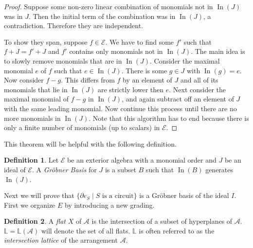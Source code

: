 \documentclass[article,twoside]{article}
\newcommand{\BB}[1]{\mathbb{#1}}
\newcommand{\script}[1]{\mathcal{#1}}
\newcommand{\initial}{\operatorname{In}}
\newcommand{\lattice}{\BB{L}}
\theoremstyle{plain}
\theoremstyle{plain}
\theoremstyle{plain}
\theoremstyle{plain}
\theoremstyle{plain}
\theoremstyle{definition}
\newtheorem{definition}[definition]{Definition}
\theoremstyle{definition}
\theoremstyle{definition}
\theoremstyle{remark}
\theoremstyle{remark}
\begin{document}
\begin{proof}
	Suppose some non-zero linear combination of monomials not in $\initial(J)$ was in $J$. Then the initial term of the combination was in $\initial(J)$, a contradiction. Therefore they are independent.

	To show they span, suppose $f\in \script{E}$. We have to find some $f'$ such that $f+J=f'+J$ and $f'$ contains only monomials not in $\initial(J)$. The main idea is to slowly remove monomials that are in $\initial(J)$. Consider the maximal monomial $e$ of $f$ such that $e\in\initial(J)$. There is some $g\in J$ with $\initial(g)=e$. Now consider $f-g$. This differs from $f$ by an element of $J$ and all of its monomials that lie in $\initial(J)$ are strictly lower then $e$. Next consider the maximal monomial of $f-g$ in $\initial(J)$, and again subtract off an element of $J$ with the same leading monomial. Now continue this process until there are no more monomials in $\initial(J)$. Note that this algorithm has to end because there is only a finite number of monomials (up to scalars) in $\script{E}$.
\end{proof}




This theorem will be helpful with the following definition.

\begin{definition}
	Let $\script{E}$ be an exterior algebra with a monomial order and $J$ be an ideal of $\script{E}$. A \emph{Gr\"obner Basis} for $J$ is a subset $B$ such that $\initial(B)$ generates $\initial(J)$.
\end{definition}




Next we will prove that $\{\partial e_S \mid S\text{ is a circuit}\}$ is a Gr\"obner basis of the ideal $I$. First we organize $E$ by introducing a new grading.

\begin{definition}\label{defn_flats}
	A \emph{flat} $X$ of $\script{A}$ is the intersection of a subset of hyperplanes of $\script{A}$. $\lattice = \lattice(\script{A})$ will denote the set of all flats. $\lattice$ is often referred to as the \emph{intersection lattice} of the arrangement $\script{A}$.
\end{definition}
\end{document}
